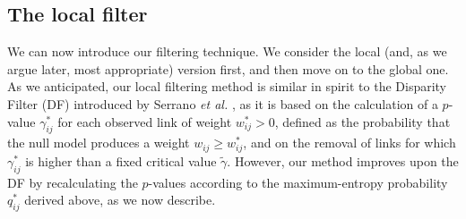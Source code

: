 \documentclass[aps,twocolumn,superscriptaddress]{revtex4-1}
\newcommand{\etal}{\emph{et al.} }
\begin{document}
\subsection{The local filter\label{sec:flocal}
}
We can now introduce our filtering technique. We consider the local (and, as we argue later, most appropriate) version first, and then move on to the global one.
As we anticipated, our local filtering method is similar in spirit to the Disparity Filter (DF) introduced by Serrano \etal \cite{serrano-pnas-2009}, 
as it is based on the calculation of a $p$-value $\gamma^\ast_{ij}$ for each observed link of weight $w_{ij}^\ast>0$, defined as the probability that the null model produces a weight $w_{ij}\ge w_{ij}^\ast$, and on the removal of links for which $\gamma_{ij}^\ast$ is higher than a fixed critical value $\widetilde{\gamma}$.
However, our method improves upon the DF by recalculating the $p$-values according to the maximum-entropy probability $q_{ij}^*$ derived above, as we now describe.
\end{document}
